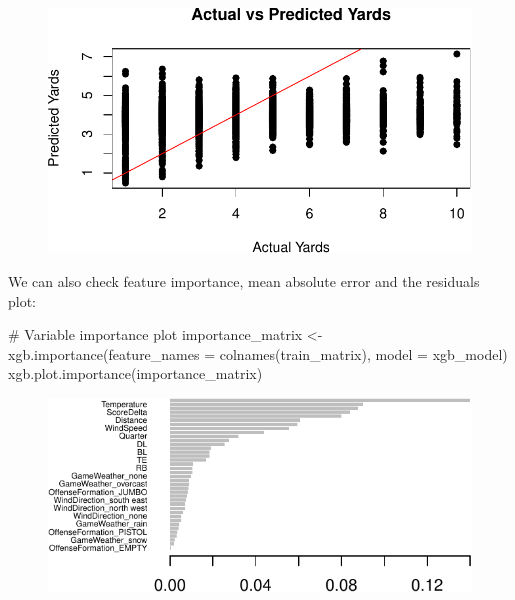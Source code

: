 \documentclass[
  super,
  preprint,
  3p]{elsarticle}
\newenvironment{Shaded}{\begin{snugshade}}{\end{snugshade}}
\newcommand{\AttributeTok}[1]{\textcolor[rgb]{0.40,0.45,0.13}{#1}}
\newcommand{\CommentTok}[1]{\textcolor[rgb]{0.37,0.37,0.37}{#1}}
\newcommand{\FunctionTok}[1]{\textcolor[rgb]{0.28,0.35,0.67}{#1}}
\newcommand{\NormalTok}[1]{\textcolor[rgb]{0.00,0.23,0.31}{#1}}
\newcommand{\OtherTok}[1]{\textcolor[rgb]{0.00,0.23,0.31}{#1}}
\begin{document}
\begin{figure}[H]

{\centering \includegraphics{project_report_files/figure-pdf/unnamed-chunk-13-1.pdf}

}

\end{figure}

We can also check feature importance, mean absolute error and the
residuals plot:

\begin{Shaded}
\begin{Highlighting}[]
\CommentTok{\# Variable importance plot}
\NormalTok{importance\_matrix }\OtherTok{\textless{}{-}} \FunctionTok{xgb.importance}\NormalTok{(}\AttributeTok{feature\_names =} \FunctionTok{colnames}\NormalTok{(train\_matrix), }\AttributeTok{model =}\NormalTok{ xgb\_model)}
\FunctionTok{xgb.plot.importance}\NormalTok{(importance\_matrix)}
\end{Highlighting}
\end{Shaded}

\begin{figure}[H]

{\centering \includegraphics{project_report_files/figure-pdf/unnamed-chunk-14-1.pdf}

}

\end{figure}
\end{document}
